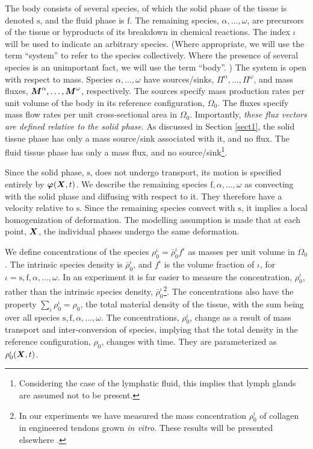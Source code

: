 The body consists of several species, of which the solid phase of
the tissue is denoted $\mathrm{s}$, and the fluid phase is
$\mathrm{f}$. The remaining species, $\alpha,\dots,\omega$, are
precursors of the tissue or byproducts of its breakdown in
chemical reactions. The index $\iota$ will be used to indicate an
arbitrary species. (Where appropriate, we will use the term
``system'' to refer to the species collectively. Where the
presence of several species is an unimportant fact, we will use
the term ``body''. ) The system is open with respect to mass.
Species $\alpha,\dots,\omega$ have sources/sinks,
$\Pi^\alpha,\dots,\Pi^\omega$, and mass fluxes,
$\mbox{\boldmath$ M$}^\alpha,\dots,\mbox{\boldmath$ M$}^\omega$, respectively. The sources specify
mass production rates per unit volume of the body in its reference
configuration, $\Omega_0$. The fluxes specify mass flow rates per
unit cross-sectional area in $\Omega_0$. Importantly, \emph{these
flux vectors are defined relative to the solid phase}. As
discussed in Section \ref{sect1}, the solid tissue phase has only
a mass source/sink associated with it, and no flux. The fluid
tissue phase has only a mass flux, and no
source/sink\footnote{Considering the case of the lymphatic fluid,
this implies that lymph glands are assumed not to be present.}.

Since the solid phase, $\mathrm{s}$, does not undergo transport,
its motion is specified entirely by $\mbox{\boldmath$\varphi$}(\mbox{\boldmath$ X$},t)$. We describe
the remaining species $\mathrm{f},\alpha,\dots,\omega$ as
convecting with the solid phase and diffusing with respect to it.
They therefore have a velocity relative to $\mathrm{s}$. Since the
remaining species convect with $\mathrm{s}$, it implies a local
homogenization of deformation. The modelling assumption is made
that at each point, $\mbox{\boldmath$ X$}$, the individual phases undergo the same
deformation.

We define concentrations of the species
$\rho_0^\iota=\bar{\rho}_0^\iota f^\iota$ as masses per unit
volume in $\Omega_0$. The intrinsic species density is
$\bar{\rho}_0^\iota$, and $f^\iota$ is the volume fraction of
$\iota$, for $\iota = \mathrm{s,f},\alpha,\dots,\omega$. In an
experiment it is far easier to measure the concentration,
$\rho_0^\iota$, rather than the intrinsic species density,
$\bar{\rho}_0^\iota$\footnote{In our experiments we have measured
the mass concentration $\rho_0^\iota$ of collagen in engineered
tendons grown \emph{in vitro}. These results will be presented
elsewhere \citep{Calve:04}.}. The concentrations also have
the property $\sum\limits_{\iota}\rho_0^\iota = \rho_0$, the total
material density of the tissue, with the sum being over all
species $\mathrm{s,f},\alpha,\dots,\omega$. The concentrations,
$\rho_0^\iota$, change as a result of mass transport and
inter-conversion of species, implying that the total density in
the reference configuration, $\rho_0$, changes with time. They are
parameterized as $\rho_0^\iota(\mbox{\boldmath$ X$},t)$.



